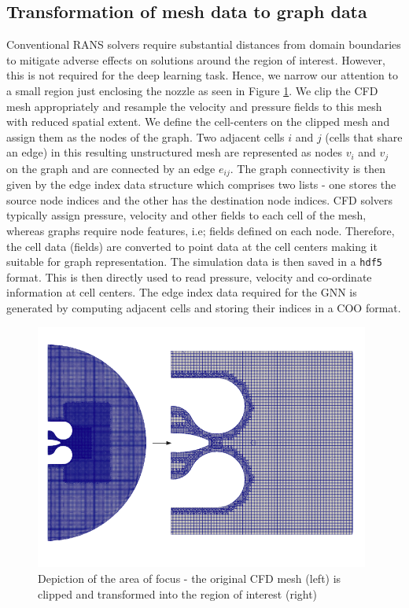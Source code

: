 \subsection{Transformation of mesh data to graph data}
Conventional RANS solvers require substantial distances from domain boundaries to mitigate adverse effects on solutions around the region of interest. However, this is not required for the deep learning task. Hence, we narrow our attention to a small region just enclosing the nozzle as seen in Figure \ref{clipmesh}. We clip the CFD mesh appropriately and resample the velocity and pressure fields to this mesh with reduced spatial extent. We define the cell-centers on the clipped mesh and assign them as the nodes of the graph. Two adjacent cells $i$ and $j$ (cells that share an edge) in this resulting unstructured mesh are represented as nodes $v_i$ and $v_j$ on the graph and are connected by an edge $e_{ij}$. The graph connectivity is then given by the edge index data structure which comprises two lists - one stores the source node indices and the other has the destination node indices. CFD solvers typically assign pressure, velocity and other fields to each cell of the mesh, whereas graphs require node features, i.e; fields defined on each node. Therefore, the cell data (fields) are converted to point data at the cell centers making it suitable for graph representation. The simulation data is then saved in a \verb|hdf5| format. This is then directly used to read pressure, velocity and co-ordinate information at cell centers. 
The edge index data required for the GNN is generated by computing adjacent cells and storing their indices in a \gls{COO} format. 
\begin{figure}[ht]
    \centering
    \includegraphics[width=11cm]{images/Methodology/Clipped.png}
    \caption{Depiction of the area of focus - the original CFD mesh (left) is clipped and transformed into the region of interest (right)}
    \label{clipmesh}
\end{figure}
